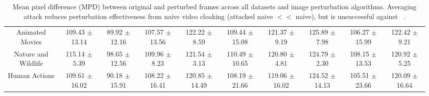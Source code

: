 \begin{table}[t]
{\begin{tabular}{cccccccccc}
\multicolumn{1}{c|}{Animated Movies}     & 109.43 $\pm$ 13.14 & 89.92 $\pm$ 12.16                                        & \multicolumn{1}{c|}{107.57 $\pm$ 13.56}                                                 & 122.22 $\pm$ 8.59  & 109.44 $\pm$ 15.08                                       & \multicolumn{1}{c|}{121.37 $\pm$ 9.19}                                                  & 125.89 $\pm$ 7.98  & 106.27 $\pm$ 15.99                                       & 122.42 $\pm$ 9.21                                                  \\
\multicolumn{1}{c|}{Nature and Wildlife} & 115.14 $\pm$ 5.39  & 98.65 $\pm$ 12.56                                        & \multicolumn{1}{c|}{109.96 $\pm$ 8.23}                                                  & 121.54 $\pm$ 3.13  & 110.49 $\pm$ 10.65                                       & \multicolumn{1}{c|}{120.80 $\pm$ 4.81}                                                  & 124.79 $\pm$ 2.30  & 108.15 $\pm$ 13.53                                       & 120.92 $\pm$ 5.25                                                  \\
\multicolumn{1}{c|}{Human Actions}       & 109.61 $\pm$ 16.02 & 90.18 $\pm$ 15.91                                        & \multicolumn{1}{c|}{108.22 $\pm$ 16.41}                                                 & 120.85 $\pm$ 14.49 & 108.19 $\pm$ 21.66                                       & \multicolumn{1}{c|}{119.06 $\pm$ 16.02}                                                 & 124.52 $\pm$ 14.13 & 105.51 $\pm$ 23.66                                       & 120.09 $\pm$ 16.64                                                
\end{tabular}
    }
    \caption{Mean pixel difference (MPD) between original and perturbed frames across all datasets and image perturbation algorithms. Averaging attack reduces perturbation effectiveness from naive video cloaking (attacked naive $<<$ naive), but is unsuccessful against \system~.}
    \label{tab:adv-algorithm-robustness-pd}
\end{table}


